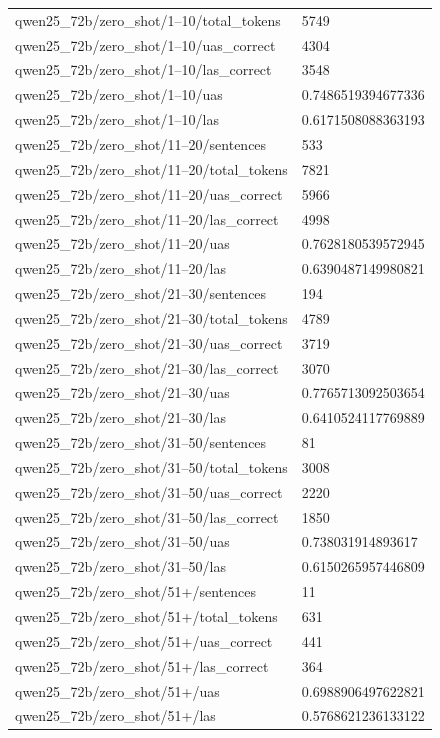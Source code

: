 \begin{tabular}{ll}
qwen25\_72b/zero\_shot/1–10/total\_tokens & 5749 \\
qwen25\_72b/zero\_shot/1–10/uas\_correct & 4304 \\
qwen25\_72b/zero\_shot/1–10/las\_correct & 3548 \\
qwen25\_72b/zero\_shot/1–10/uas & 0.7486519394677336 \\
qwen25\_72b/zero\_shot/1–10/las & 0.6171508088363193 \\
qwen25\_72b/zero\_shot/11–20/sentences & 533 \\
qwen25\_72b/zero\_shot/11–20/total\_tokens & 7821 \\
qwen25\_72b/zero\_shot/11–20/uas\_correct & 5966 \\
qwen25\_72b/zero\_shot/11–20/las\_correct & 4998 \\
qwen25\_72b/zero\_shot/11–20/uas & 0.7628180539572945 \\
qwen25\_72b/zero\_shot/11–20/las & 0.6390487149980821 \\
qwen25\_72b/zero\_shot/21–30/sentences & 194 \\
qwen25\_72b/zero\_shot/21–30/total\_tokens & 4789 \\
qwen25\_72b/zero\_shot/21–30/uas\_correct & 3719 \\
qwen25\_72b/zero\_shot/21–30/las\_correct & 3070 \\
qwen25\_72b/zero\_shot/21–30/uas & 0.7765713092503654 \\
qwen25\_72b/zero\_shot/21–30/las & 0.6410524117769889 \\
qwen25\_72b/zero\_shot/31–50/sentences & 81 \\
qwen25\_72b/zero\_shot/31–50/total\_tokens & 3008 \\
qwen25\_72b/zero\_shot/31–50/uas\_correct & 2220 \\
qwen25\_72b/zero\_shot/31–50/las\_correct & 1850 \\
qwen25\_72b/zero\_shot/31–50/uas & 0.738031914893617 \\
qwen25\_72b/zero\_shot/31–50/las & 0.6150265957446809 \\
qwen25\_72b/zero\_shot/51+/sentences & 11 \\
qwen25\_72b/zero\_shot/51+/total\_tokens & 631 \\
qwen25\_72b/zero\_shot/51+/uas\_correct & 441 \\
qwen25\_72b/zero\_shot/51+/las\_correct & 364 \\
qwen25\_72b/zero\_shot/51+/uas & 0.6988906497622821 \\
qwen25\_72b/zero\_shot/51+/las & 0.5768621236133122 \\

\end{tabular}
